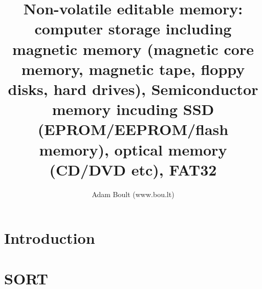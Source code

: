 \documentclass[oneside]{book}
\begin{document}
\author{Adam Boult (www.bou.lt)}
\title{Non-volatile editable memory: computer storage including magnetic memory (magnetic core memory, magnetic tape, floppy disks, hard drives), Semiconductor memory incuding SSD (EPROM/EEPROM/flash memory), optical memory (CD/DVD etc), FAT32}
\maketitle

\setcounter{tocdepth}{0}
\tableofcontents



\part{Introduction}





\part{SORT}

\end{document}
